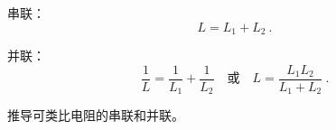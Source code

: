 
\begin{issues}
\issueDraft
\end{issues}


串联：
\begin{equation}
L = L_1 + L_2~.
\end{equation}


并联：
\begin{equation}
\frac{1}{L} = \frac{1}{L_1} + \frac{1}{L_2}
\quad \text{或} \quad
L = \frac{L_1L_2}{L_1 + L_2}~.
\end{equation}


推导可类比电阻的串联和并联。
